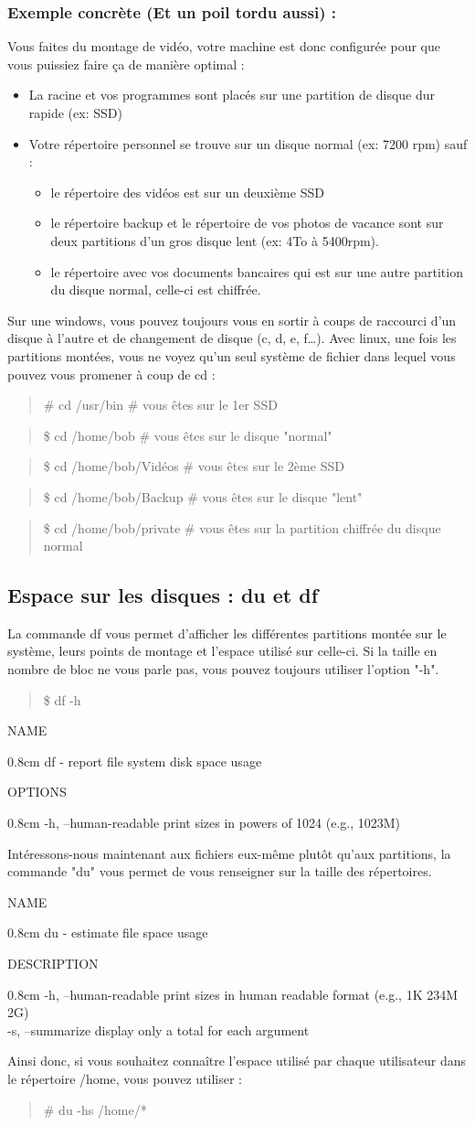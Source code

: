 \documentclass[a4paper,11pt]{article}
\newcommand{\commande}[1] {
    \begin{quote}
    \tt\raggedright #1 
    \end{quote}
}
\newcommand{\man}[2]{
    \begin{tcolorbox}[toprule=3mm,width=\textwidth,outer arc=0mm,colbacktitle=grayman,coltitle=black,colback={grayman},colframe={grayman},title={man : \tt #1}]
        \tt\raggedright #2
    \end{tcolorbox}
}
\newcommand{\mandesc}[1]{
    \begin{adjustwidth}{0.8cm}{}
        #1
    \end{adjustwidth}
}
\begin{document}
\subsubsection*{Exemple concrète (Et un poil tordu aussi) :}
\par Vous faites du montage de vidéo, votre machine est donc configurée pour que vous puissiez faire ça de manière optimal :
\begin{itemize}
\item La racine et vos programmes sont placés sur une partition de disque dur rapide (ex: SSD)
\item Votre répertoire personnel se trouve sur un disque normal (ex: 7200 rpm) sauf :
    \begin{itemize}
    \item le répertoire des vidéos est sur un deuxième SSD
    \item le répertoire backup et le répertoire de vos photos de vacance sont sur deux partitions d'un gros disque lent (ex: 4To à 5400rpm).
    \item le répertoire avec vos documents bancaires qui est sur une autre partition du disque normal, celle-ci est chiffrée.
    \end{itemize}
\end{itemize}
\par Sur une windows, vous pouvez toujours vous en sortir à coups de raccourci d'un disque à l'autre et de changement de disque (c, d, e, f\dots). Avec linux, une fois les partitions montées, vous ne voyez qu'un seul système de fichier dans lequel vous pouvez vous promener à coup de cd :
\commande{\# cd /usr/bin \# vous êtes sur le 1er SSD}
\commande{\$ cd /home/bob \# vous êtes sur le disque "normal"}
\commande{\$ cd /home/bob/Vidéos \# vous êtes sur le 2ème SSD}
\commande{\$ cd /home/bob/Backup \# vous êtes sur le disque "lent"}
\commande{\$ cd /home/bob/private \# vous êtes sur la partition chiffrée du disque normal}

\subsection{Espace sur les disques : du et df}
\par La commande df vous permet d'afficher les différentes partitions montée sur le système, leurs points de montage et l'espace utilisé sur celle-ci. Si la taille en nombre de bloc ne vous parle pas, vous pouvez toujours utiliser l'option "-h".
\commande{\$ df -h}
\man{df}{
NAME
\mandesc{df - report file system disk space usage}
OPTIONS
\mandesc{-h, --human-readable print sizes in powers of 1024 (e.g., 1023M)}
}
\par Intéressons-nous maintenant aux fichiers eux-même plutôt qu'aux partitions, la commande "du" vous permet de vous renseigner sur la taille des répertoires.
\man{du}{
NAME
\mandesc{du - estimate file space usage}
DESCRIPTION
\mandesc{-h, --human-readable print sizes in human readable format (e.g., 1K 234M 2G)\\
-s, --summarize display only a total for each argument}
}
Ainsi donc, si vous souhaitez connaître l'espace utilisé par chaque utilisateur dans le répertoire /home, vous pouvez utiliser :
\commande{\# du -hs /home/*}
\end{document}
